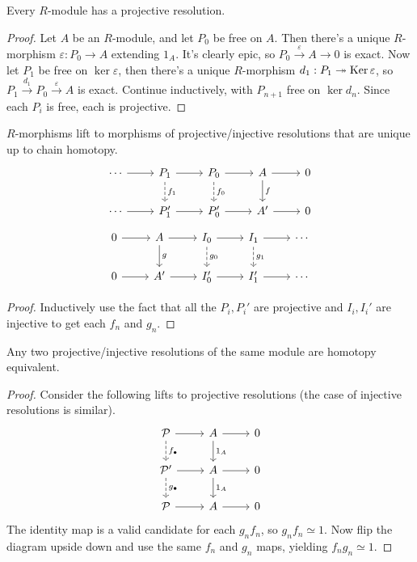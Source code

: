 \documentclass[twoside,10pt]{report}
\begin{document}
\begin{thrm}[Existence]
	Every $R$-module has a projective  resolution.
\end{thrm}
\begin{proof}
	Let $A$ be an $R$-module, and let $P_0$ be free on $A$. Then there's a unique $R$-morphism $\varepsilon:P_0\to A$ extending $1_{A}$. It's clearly epic, so $P_0 \stackrel{\varepsilon}{\to } A\to 0$ is exact. Now let $P_1$ be free on $\ker \varepsilon$, then there's a unique $R$-morphism $d_1:P_1\twoheadrightarrow \operatorname{Ker} \varepsilon$, so $P_1\stackrel{d_1}{\to } P_0\stackrel{\varepsilon}{\to } A$ is exact. Continue inductively, with $P_{n+1}$ free on $\ker d_{n}$. Since each $P_i$ is free, each is projective.
\end{proof}

\begin{prop}
$R$-morphisms lift to morphisms of projective/injective resolutions that are unique up to chain homotopy.
\[
\begin{tikzcd}
	\cdots \rar & P_1 \rar\dar[dashed]{f_1} & P_0 \rar\dar[dashed]{f_0} & A \rar\dar{f} & 0 \\
	\cdots \rar & P_1' \rar & P_0' \rar & A' \rar & 0
\end{tikzcd}
\]
\[
	\begin{tikzcd}
		0 \rar & A \rar\dar{g} & I_{0} \rar\dar[dashed]{g_0} & I_{1} \rar\dar[dashed]{g_1} & \cdots \\
		0 \rar & A' \rar & I_{0}' \rar & I_1' \rar & \cdots
\end{tikzcd}
\] 
\end{prop}
\begin{proof}
	Inductively use the fact that all the $P_i,P_i'$ are projective and $I_{i}, I_{i}'$ are injective to get each $f_n$ and $g_{n}$. 
\end{proof}

\begin{cor}
	\label{resolutions-homotopy-equiv}
Any two projective/injective resolutions of the same module are homotopy equivalent.
\end{cor}
\begin{proof}
	Consider the following lifts to projective resolutions (the case of injective resolutions is similar).
	\[
		\begin{tikzcd}
			\mathcal{P} \rar\dar[dashed]{f_{\bullet}} & A \rar\dar{1_A} & 0 \\
			\mathcal{P}' \rar\dar[dashed]{g_{\bullet}} & A \rar\dar{1_{A}} & 0 \\
			\mathcal{P} \rar & A \rar & 0
		\end{tikzcd}
	\] 
	The identity map is a valid candidate for each $g_n f_n$, so $g_n f_n \simeq 1$. Now flip the diagram upside down and use the same $f_n$ and $g_n$ maps, yielding $f_n g_n \simeq 1$.
\end{proof}
\end{document}
